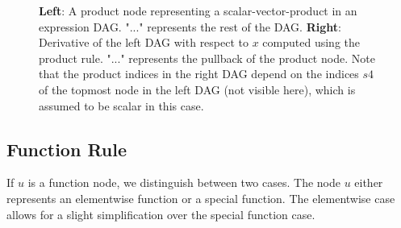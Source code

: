 \documentclass[12pt, a4paper]{report}
\begin{document}
\begin{figure}
    \centering
    \begin{minipage}{7cm}
        \centering
    \end{minipage}
    \begin{minipage}{7cm}
        \centering
    \end{minipage}
    \caption{\textbf{Left}: A product node representing a scalar-vector-product in an expression DAG. "..." represents the rest of the DAG. \textbf{Right}: Derivative of the left DAG with respect to $x$ computed using the product rule. "..." represents the pullback of the product node. Note that the product indices in the right DAG depend on the indices $s4$ of the topmost node in the left DAG (not visible here), which is assumed to be scalar in this case.}
    \label{fig:prod_rule}
\end{figure}

\subsection{Function Rule}
If $u$ is a function node, we distinguish between two cases.
The node $u$ either represents an elementwise function or a special function.
The elementwise case allows for a slight simplification over the special function case.
\end{document}
